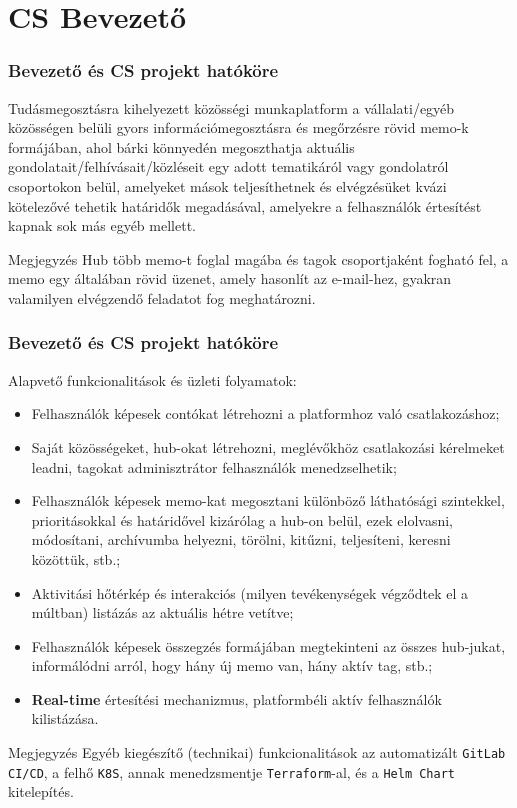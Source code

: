 \section{CS Bevezető}

\begin{frame}
    \frametitle{Bevezető és CS projekt hatóköre}

    Tudásmegosztásra kihelyezett közösségi munkaplatform a vállalati/egyéb közösségen belüli gyors információmegosztásra és megőrzésre rövid memo-k formájában, ahol bárki könnyedén megoszthatja aktuális gondolatait/felhívásait/közléseit egy adott tematikáról vagy gondolatról csoportokon belül, amelyeket mások teljesíthetnek és elvégzésüket kvázi kötelezővé tehetik határidők megadásával, amelyekre a felhasználók értesítést kapnak sok más egyéb mellett.

    \medbreak

    \begin{block}{Megjegyzés}
        Hub több memo-t foglal magába és tagok csoportjaként fogható fel, a memo egy általában rövid üzenet, amely hasonlít az e-mail-hez, gyakran valamilyen elvégzendő feladatot fog meghatározni.
    \end{block}
\end{frame}

\begin{frame}
    \frametitle{Bevezető és CS projekt hatóköre}

    Alapvető funkcionalitások és üzleti folyamatok:
    \begin{itemize}
        \item Felhasználók képesek contókat létrehozni a platformhoz való csatlakozáshoz;
        \item Saját közösségeket, hub-okat létrehozni, meglévőkhöz csatlakozási kérelmeket leadni, tagokat adminisztrátor felhasználók menedzselhetik;
        \item Felhasználók képesek memo-kat megosztani különböző láthatósági szintekkel, prioritásokkal és határidővel kizárólag a hub-on belül, ezek elolvasni, módosítani, archívumba helyezni, törölni, kitűzni, teljesíteni, keresni közöttük, stb.;
        \item Aktivitási hőtérkép és interakciós (milyen tevékenységek végződtek el a múltban) listázás az aktuális hétre vetítve;
        \item Felhasználók képesek összegzés formájában megtekinteni az összes hub-jukat, informálódni arról, hogy hány új memo van, hány aktív tag, stb.;
        \item \textbf{Real-time} értesítési mechanizmus, platformbéli aktív felhasználók kilistázása.
    \end{itemize}

    \begin{block}{Megjegyzés}
        Egyéb kiegészítő (technikai) funkcionalitások az automatizált \texttt{GitLab CI/CD}, a felhő \texttt{K8S}, annak menedzsmentje \texttt{Terraform}-al, és a \texttt{Helm Chart} kitelepítés.
    \end{block}
\end{frame}